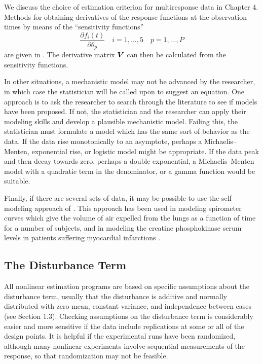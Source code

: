 \begin{example}
We discuss the choice of estimation criterion for multiresponse data
in Chapter 4.
Methods for obtaining derivatives of the response functions at
the observation times by means of the
``sensitivity functions''
      \begin{displaymath}
        \frac{\partial f_i(t)}{\partial\theta_p}\quad
        i=1,\ldots,5\quad p = 1 ,\ldots, P 
      \end{displaymath}
are given in .
The derivative matrix ${\boldsymbol V}$ can then be calculated from the
sensitivity functions.
\end{example}

In other situations, a mechanistic model may not be advanced by
the researcher, in which case the statistician will be called
upon to suggest an equation.
One approach is to ask the researcher to search through the
literature to see if models have been proposed.
If not, the statistician and the researcher can apply their
modeling skills and develop a plausible mechanistic model.
Failing this, the statistician must formulate a model which has
the same sort of behavior as the data.
If the data rise monotonically to an asymptote, perhaps a
Michaelis--Menten, exponential rise, or logistic model might be
appropriate.
If the data peak and then decay towards zero, perhaps a
double exponential, a Michaelis--Menten model with a quadratic
term in the denominator, or a gamma function would be suitable.

Finally, if there are several sets of data, it may be possible to use
the self-modeling approach of .
This approach has been used in modeling spirometer curves
which give the volume of air expelled
from the lungs as a function of time for a number of subjects,
and in modeling the
creatine phosphokinase serum levels in patients suffering
myocardial infarctions \cite{arms:watt:hami:chio:park:1979}.

\subsection{The Disturbance Term}

All nonlinear estimation programs are based on specific
assumptions about the disturbance term, usually that the
disturbance is additive and normally distributed with zero mean,
constant variance, and independence between cases (see Section
1.3).
Checking assumptions on the disturbance term is considerably
easier and more sensitive
if the data include replications at some or all of the design
points.
It is helpful if the experimental runs have been randomized,
although many nonlinear experiments involve sequential
measurements of the response, so that randomization may not be
feasible.

